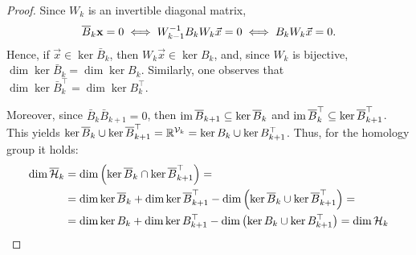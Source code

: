 \begin{proof}
Since \( W_k \) is an invertible diagonal matrix, 
\begin{equation*}
    \overline{B}_k \mathbf{x} = 0 \iff W_{k-1}^{-1}B_k W_k \vec x =0 \iff B_k W_k \vec x =0. 
\end{equation*}
Hence, if \( \vec x \in \ker \bar B_k \), then \( W_k \vec x \in \ker B_k \), and, since \( W_k \) is bijective, \( \dim \ker \bar B_k = \dim \ker B_k \). Similarly, one observes that \( \dim \ker \bar B_k^\top = \dim \ker B_k^\top \).

Moreover, since \( \bar B_k \bar B_{k+1} =0 \), then \( \operatorname{im} \overline{B}_{k+1} \subseteq \ker \overline{B}_k \) and \( \operatorname{im} \overline{B}_k^\top \subseteq \ker \overline{B}_{k+1}^\top \). This yields \( \ker \overline{B}_k \cup \ker \overline{B}_{k+1}^\top = \mathbb{R}^{\mathcal{V}_k} = \ker B_k \cup \ker  B_{k+1}^\top\). Thus, for the homology group it holds:
\begin{equation*}
      \begin{aligned}
    \dim \overline{\mathcal{H}}_k & = \dim \left( \ker \overline{B}_k \cap \ker \overline{B}_{k+1}^\top \right)= \\
    & = \dim \ker \overline{B}_k + \dim \ker \overline{B}_{k+1}^\top - \dim \left( \ker \overline{B}_k \cup \ker \overline{B}_{k+1}^\top \right) = \\
    & = \dim \ker B_k + \dim \ker  B_{k+1}^\top - \dim \left( \ker  B_k \cup \ker  B_{k+1}^\top \right) = \dim \mathcal{H}_k
      \end{aligned}
\end{equation*}
\end{proof}
